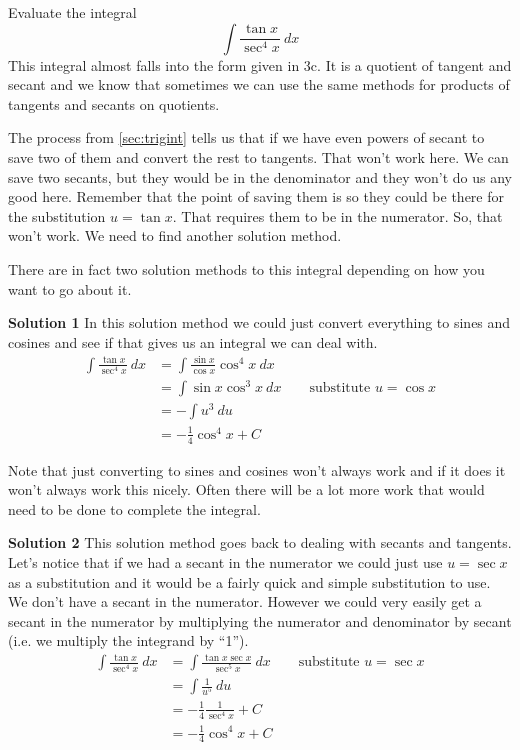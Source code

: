 \begin{example}\label{ex_int_strat_tan_sec}
Evaluate the integral
\[\int \frac{\tan x}{\sec^4 x}\ dx\]
\solution
This integral almost falls into the form given in 3c. It is a quotient of tangent and secant and we know that sometimes we can use the same methods for products of tangents and secants on quotients.

The process from \autoref{sec:trigint} tells us that if we have even powers of secant to save two of them and convert the rest to tangents. That won't work here. We can save two secants, but they would be in the denominator and they won't do us any good here. Remember that the point of saving them is so they could be there for the substitution $u = \tan x$. That requires them to be in the numerator. So, that won't work. We need to find another solution method.

There are in fact two solution methods to this integral depending on how you want to go about it.

\textbf{Solution 1} \indent In this solution method we could just convert everything to sines and cosines and see if that gives us an integral we can deal with.
\begin{align*}
	\int \frac{\tan x}{\sec^4 x}\ dx
	&= \int \frac{\sin x}{\cos x} \cos^4 x \ dx\\
	&= \int \sin x \cos^3 x \ dx \qquad\text{substitute $u = \cos x$}\\
	&= -\int u^3 \ du \\
	&=-\frac{1}{4} \cos^4 x +C
\end{align*}

Note that just converting to sines and cosines won't always work and if it does it won't always work this nicely. Often there will be a lot more work that would need to be done to complete the integral.\bigskip

\textbf{Solution 2} \indent This solution method goes back to dealing with secants and tangents. Let's notice that if we had a secant in the numerator we could just use $u = \sec x$ as a substitution and it would be a fairly quick and simple substitution to use. We don't have a secant in the numerator. However we could very easily get a secant in the numerator by multiplying the numerator and denominator by secant (i.e. we multiply the integrand by ``1''). 
\begin{align*}
	\int \frac{\tan x}{\sec^4 x}\ dx
	&= \int \frac{\tan x \sec x}{\sec^5 x}\ dx \qquad\text{substitute $u = \sec x$}\\
	&= \int \frac{1}{u^5}\ du \\
	&=-\frac{1}{4} \frac{1}{\sec^4 x}+C\\
	&=-\frac{1}{4} \cos^4 x +C
\end{align*}
\end{example}

